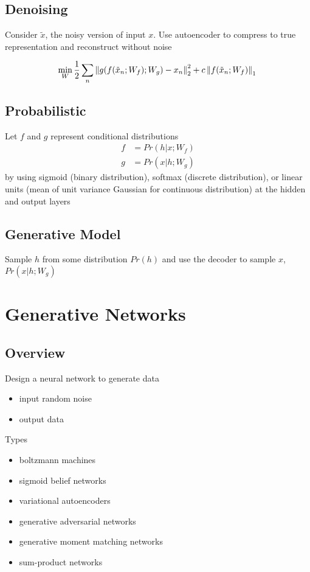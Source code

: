 \documentclass[]{article}
\theoremstyle{definition}
\newcommand\norm[1]{\left\lVert#1\right\rVert}
\begin{document}
\subsection{Denoising}
\label{sub:denoising}
Consider $\tilde x$, the noisy version of input $x$. Use autoencoder to compress to true representation and reconstruct without noise

\begin{equation*}
    \min_W \frac{1}{2} \sum_n \norm{g(f(\tilde x_n;W_f); W_g) - x_n}^2_2 + c \norm{f(\tilde x_n; W_f)}_1 \\
\end{equation*}

\subsection{Probabilistic}
\label{sub:probabilistic}
Let $f$ and $g$ represent conditional distributions
\begin{align*}
    f &= Pr(h | x; W_f) \\
    g &= Pr(x | h; W_g)
\end{align*}
by using sigmoid (binary distribution), softmax (discrete distribution), or linear units 
(mean of unit variance Gaussian for continuous distribution) at the hidden and output layers

\subsection{Generative Model}
\label{sub:generative_model}

Sample $h$ from some distribution $Pr(h)$ and use the decoder to sample $x$, $Pr(x | h; W_g)$

\section{Generative Networks}
\label{sec:generative_networks}

\subsection{Overview}
\label{sub:overview}
Design a neural network to generate data
\begin{itemize}
    \item input random noise
    \item output data
\end{itemize}

Types
\begin{itemize}
    \item boltzmann machines
    \item sigmoid belief networks
    \item variational autoencoders
    \item generative adversarial networks
    \item generative moment matching networks
    \item sum-product networks
\end{itemize}
\end{document}

